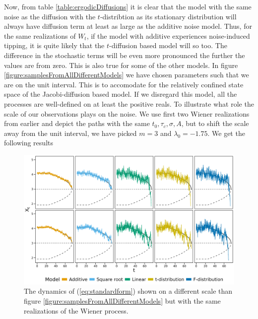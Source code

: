 Now, from table \ref{table:ergodicDiffusions} it is clear that the model with the same noise as the diffusion with the $t$-distribtion as its stationary distribution will always have diffusion term at least as large as the additive noise model. Thus, for the same realizations of $W_t$, if the model with additive experiences noise-induced tipping, it is quite likely that the $t$-diffusion based model will so too. The difference in the stochastic terms will be even more pronounced the further the values are from zero. This is also true for some of the other models. In figure \ref{figure:samplesFromAllDifferentModels} we have chosen parameters such that we are on the unit interval. This is to accomodate for the relatively confined state space of the Jacobi-diffusion based model. If we disregard this model, all the processes are well-defined on at least the positive reals. To illustrate what role the scale of our observations plays on the noise. We use first two Wiener realizations from earlier and depict the paths with the same $t_0, \tau_c, \sigma, A$, but to shift the scale away from the unit interval, we have picked $m = 3$ and $\lambda_0 = -1.75$. We get the following results
\begin{figure}[h]
    \begin{center}
        \includegraphics[scale = .1]{figures/sample_paths_plot_big_scale.jpeg}
        \caption{The dynamics of (\ref{eq:standardform}) shown on a different scale than figure \ref{figure:samplesFromAllDifferentModels} but with the same realizations of the Wiener process.}
        \label{figure:samplesFromFiveDifferentModels}
    \end{center}
\end{figure}\\
